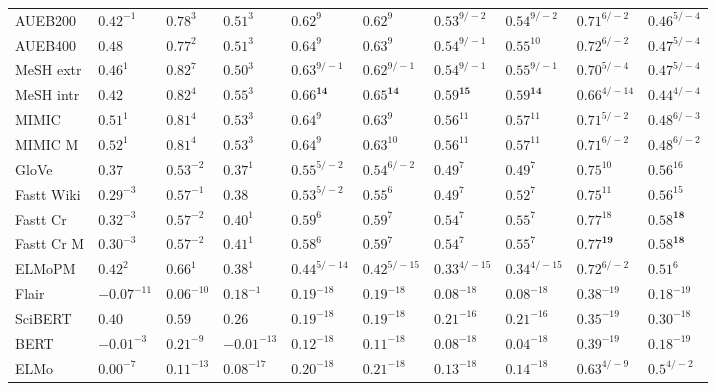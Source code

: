 \documentclass[letterpaper]{article} %
\begin{document}
\begin{table*}[th]
\begin{tabular}{l l l l l l l l l l}
AUEB200 & $0.42^{-1}$ & $0.78^{3}$ & $0.51^{3}$ & $0.62^{9}$ & $0.62^{9}$ & $0.53^{9/-2}$ & $0.54^{9/-2}$ & $0.71^{6/-2}$ & $0.46^{5/-4}$ \\
AUEB400 & $0.48$ & $0.77^{2}$ & $0.51^{3}$ & $0.64^{9}$ & $0.63^{9}$ & $0.54^{9/-1}$ & $0.55^{10}$ & $0.72^{6/-2}$ & $0.47^{5/-4}$ \\
MeSH extr & $0.46^{1}$ & $0.82^{7}$ & $0.50^{3}$ & $0.63^{9/-1}$ & $0.62^{9/-1}$ & $0.54^{9/-1}$ & $0.55^{9/-1}$ & $0.70^{5/-4}$ & $0.47^{5/-4}$ \\
MeSH intr & $0.42$ & $0.82^{4}$ & $0.55^{3}$ & $\mathbf{0.66^{14}}$ & $\mathbf{0.65^{14}}$ & $\mathbf{0.59^{15}}$ & $\mathbf{0.59^{14}}$ & $0.66^{4/-14}$ & $0.44^{4/-4}$ \\
MIMIC & $0.51^{1}$ & $0.81^{4}$ & $0.53^{3}$ & $0.64^{9}$ & $0.63^{9}$ & $0.56^{11}$ & $0.57^{11}$ & $0.71^{5/-2}$ & $0.48^{6/-3}$ \\
MIMIC M & $0.52^{1}$ & $0.81^{4}$ & $0.53^{3}$ & $0.64^{9}$ & $0.63^{10}$ & $0.56^{11}$ & $0.57^{11}$ & $0.71^{6/-2}$ & $0.48^{6/-2}$ \\
\midrule
GloVe & $0.37$ & $0.53^{-2}$ & $0.37^{1}$ & $0.55^{5/-2}$ & $0.54^{6/-2}$ & $0.49^{7}$ & $0.49^{7}$ & $0.75^{10}$ & $0.56^{16}$ \\
Fastt Wiki & $0.29^{-3}$ & $0.57^{-1}$ & $0.38$ & $0.53^{5/-2}$ & $0.55^{6}$ & $0.49^{7}$ & $0.52^{7}$ & $0.75^{11}$ & $0.56^{15}$ \\
Fastt Cr & $0.32^{-3}$ & $0.57^{-2}$ & $0.40^{1}$ & $0.59^{6}$ & $0.59^{7}$ & $0.54^{7}$ & $0.55^{7}$ & $0.77^{18}$ & $\mathbf{0.58^{18}}$ \\
Fastt Cr M & $0.30^{-3}$ & $0.57^{-2}$ & $0.41^{1}$ & $0.58^{6}$ & $0.59^{7}$ & $0.54^{7}$ & $0.55^{7}$ & $\mathbf{0.77^{19}}$ & $\mathbf{0.58^{18}}$ \\
\midrule
ELMoPM & $0.42^{2}$ & $0.66^{1}$ & $0.38^{1}$ & $0.44^{5/-14}$ & $0.42^{5/-15}$ & $0.33^{4/-15}$ & $0.34^{4/-15}$ & $0.72^{6/-2}$ & $0.51^{6}$ \\
Flair & $-0.07^{-11}$ & $0.06^{-10}$ & $0.18^{-1}$ & $0.19^{-18}$ & $0.19^{-18}$ & $0.08^{-18}$ & $0.08^{-18}$ & $0.38^{-19}$ & $0.18^{-19}$ \\
SciBERT & $0.40$ & $0.59$ & $0.26$ & $0.19^{-18}$ & $0.19^{-18}$ & $0.21^{-16}$ & $0.21^{-16}$ & $0.35^{-19}$ & $0.30^{-18}$ \\
BERT & $-0.01^{-3}$ & $0.21^{-9}$ & $-0.01^{-13}$ & $0.12^{-18}$ & $0.11^{-18}$ & $0.08^{-18}$ & $0.04^{-18}$ & $0.39^{-19}$ & $0.18^{-19}$ \\
ELMo & $0.00^{-7}$ & $0.11^{-13}$ & $0.08^{-17}$ & $0.20^{-18}$ & $0.21^{-18}$ & $0.13^{-18}$ & $0.14^{-18}$ & $0.63^{4/-9}$ & $0.5^{4/-2}$ \\

\end{tabular}
\end{table*}
\end{document}
